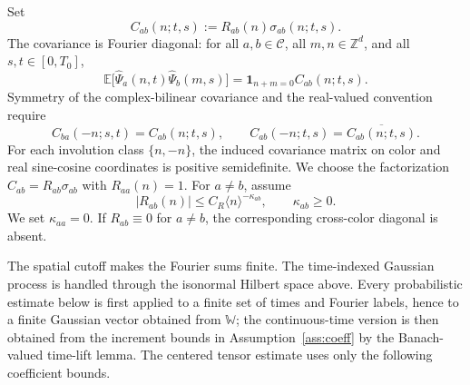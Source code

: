 \documentclass[11pt,reqno]{amsart}
\numberwithin{equation}{section}
\theoremstyle{plain}
\theoremstyle{definition}
\newcommand{\Z}{\mathbb Z}
\newcommand{\E}{\mathbb E}
\newcommand{\cC}{\mathcal C}
\newcommand{\la}{\langle}
\newcommand{\ra}{\rangle}
\newcommand{\one}{\mathbf 1}
\newcommand{\isoW}{\mathbb W}
\begin{document}
Set
\[
        C_{ab}(n;t,s):=R_{ab}(n)\sigma_{ab}(n;t,s).
\]
The covariance is Fourier diagonal: for all \(a,b\in\cC\), all \(m,n\in\Z^d\), and all \(s,t\in[0,T_0]\),
\begin{equation}\label{eq:conv-cov}
        \E\bigl[\widehat\Psi_a(n,t)\widehat\Psi_b(m,s)\bigr]
        =\one_{n+m=0}C_{ab}(n;t,s).
\end{equation}
Symmetry of the complex-bilinear covariance and the real-valued convention
require
\begin{equation}\label{eq:cov-compat}
        C_{ba}(-n;s,t)=C_{ab}(n;t,s),
        \qquad
        C_{ab}(-n;t,s)=\overline{C_{ab}(n;t,s)}.
\end{equation}
For each involution class \(\{n,-n\}\), the induced covariance matrix on color and real sine-cosine coordinates is positive semidefinite.  We choose the factorization \(C_{ab}=R_{ab}\sigma_{ab}\) with \(R_{aa}(n)=1\).  For \(a\ne b\), assume
\begin{equation}\label{eq:cov-decay}
        |R_{ab}(n)|\le C_R\la n\ra^{-\kappa_{ab}},
        \qquad \kappa_{ab}\ge0.
\end{equation}
We set \(\kappa_{aa}=0\).  If \(R_{ab}\equiv0\) for \(a\ne b\), the corresponding cross-color diagonal is absent.

The spatial cutoff makes the Fourier sums finite.  The time-indexed Gaussian process is handled through the isonormal Hilbert space above.  Every probabilistic estimate below is first applied to a finite set of times and Fourier labels, hence to a finite Gaussian vector obtained from \(\isoW\); the continuous-time version is then obtained from the increment bounds in Assumption~\ref{ass:coeff} by the Banach-valued time-lift lemma.  The centered tensor estimate uses only the following coefficient bounds.
\end{document}
